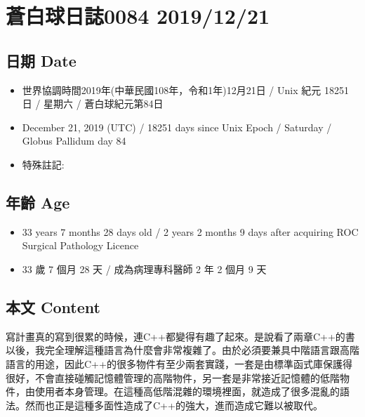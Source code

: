 \documentclass[a5paper, 12pt
]{book}
\providecommand{\tightlist}{%
  \setlength{\itemsep}{0pt}\setlength{\parskip}{0pt}}
\begin{document}
\hypertarget{ux84bcux767dux7403ux65e5ux8a8c0084-20191221}{%
\section{蒼白球日誌0084
2019/12/21}\label{ux84bcux767dux7403ux65e5ux8a8c0084-20191221}}

\hypertarget{ux65e5ux671f-date-20}{%
\subsection{日期 Date}\label{ux65e5ux671f-date-20}}

\begin{itemize}
\tightlist
\item
  世界協調時間2019年(中華民國108年，令和1年)12月21日 / Unix 紀元 18251
  日 / 星期六 / 蒼白球紀元第84日
\item
  December 21, 2019 (UTC) / 18251 days since Unix Epoch / Saturday /
  Globus Pallidum day 84
\item
  特殊註記:
\end{itemize}

\hypertarget{ux5e74ux9f61-age-20}{%
\subsection{年齡 Age}\label{ux5e74ux9f61-age-20}}

\begin{itemize}
\tightlist
\item
  33 years 7 months 28 days old / 2 years 2 months 9 days after
  acquiring ROC Surgical Pathology Licence
\item
  33 歲 7 個月 28 天 / 成為病理專科醫師 2 年 2 個月 9 天
\end{itemize}

\hypertarget{ux672cux6587-content-20}{%
\subsection{本文 Content}\label{ux672cux6587-content-20}}

寫計畫真的寫到很累的時候，連C++都變得有趣了起來。是說看了兩章C++的書以後，我完全理解這種語言為什麼會非常複雜了。由於必須要兼具中階語言跟高階語言的用途，因此C++的很多物件有至少兩套實踐，一套是由標準函式庫保護得很好，不會直接碰觸記憶體管理的高階物件，另一套是非常接近記憶體的低階物件，由使用者本身管理。在這種高低階混雜的環境裡面，就造成了很多混亂的語法。然而也正是這種多面性造成了C++的強大，進而造成它難以被取代。
\end{document}
